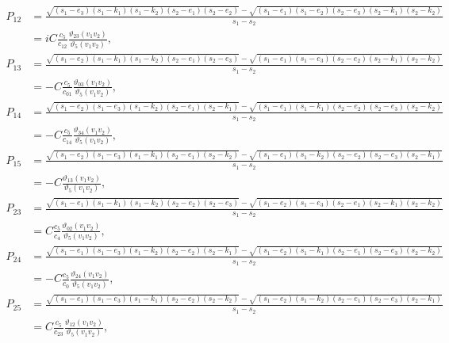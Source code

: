 \documentclass{article}
\begin{document}
\begin{align*}
P_{12} &= \frac{\sqrt{(s_1 - e_3)(s_1 - k_1)(s_1 - k_2)(s_2 - e_1)(s_2 - e_2)} - \sqrt{(s_1 - e_1)(s_1 - e_2)(s_2 - e_3)(s_2 - k_1)(s_2 - k_2)}}{s_1 - s_2} \\
&= iC\frac{c_5}{c_{12}}\frac{\vartheta_{23}(v_1v_2)}{\vartheta_5(v_1v_2)},
\end{align*}
\begin{align*}
P_{13} &= \frac{\sqrt{(s_1 - e_2)(s_1 - k_1)(s_1 - k_2)(s_2 - e_1)(s_2 - e_3)} - \sqrt{(s_1 - e_1)(s_1 - e_3)(s_2 - e_2)(s_2 - k_1)(s_2 - k_2)}}{s_1 - s_2} \\
&= -C\frac{c_5}{c_{01}}\frac{\vartheta_{03}(v_1v_2)}{\vartheta_5(v_1v_2)},
\end{align*}
\begin{align*}
P_{14} &= \frac{\sqrt{(s_1 - e_2)(s_1 - e_3)(s_1 - k_2)(s_2 - e_1)(s_2 - k_1)} - \sqrt{(s_1 - e_1)(s_1 - k_1)(s_2 - e_2)(s_2 - e_3)(s_2 - k_2)}}{s_1 - s_2} \\
&= -C\frac{c_5}{c_{14}}\frac{\vartheta_{34}(v_1v_2)}{\vartheta_5(v_1v_2)},
\end{align*}
\begin{align*}
P_{15} &= \frac{\sqrt{(s_1 - e_2)(s_1 - e_3)(s_1 - k_1)(s_2 - e_1)(s_2 - k_2)} - \sqrt{(s_1 - e_1)(s_1 - k_2)(s_2 - e_2)(s_2 - e_3)(s_2 - k_1)}}{s_1 - s_2} \\
&= -C\frac{\vartheta_{13}(v_1v_2)}{\vartheta_5(v_1v_2)},
\end{align*}
\begin{align*}
P_{23} &= \frac{\sqrt{(s_1 - e_1)(s_1 - k_1)(s_1 - k_2)(s_2 - e_2)(s_2 - e_3)} - \sqrt{(s_1 - e_2)(s_1 - e_3)(s_2 - e_1)(s_2 - k_1)(s_2 - k_2)}}{s_1 - s_2} \\
&= C\frac{c_5}{c_4}\frac{\vartheta_{02}(v_1v_2)}{\vartheta_5(v_1v_2)},
\end{align*}
\begin{align*}
P_{24} &= \frac{\sqrt{(s_1 - e_1)(s_1 - e_3)(s_1 - k_2)(s_2 - e_2)(s_2 - k_1)} - \sqrt{(s_1 - e_2)(s_1 - k_1)(s_2 - e_1)(s_2 - e_3)(s_2 - k_2)}}{s_1 - s_2} \\
&= -C\frac{c_5}{c_0}\frac{\vartheta_{24}(v_1v_2)}{\vartheta_5(v_1v_2)},
\end{align*}
\begin{align*}
P_{25} &= \frac{\sqrt{(s_1 - e_1)(s_1 - e_3)(s_1 - k_1)(s_2 - e_2)(s_2 - k_2)} - \sqrt{(s_1 - e_2)(s_1 - k_2)(s_2 - e_1)(s_2 - e_3)(s_2 - k_1)}}{s_1 - s_2} \\
&= C\frac{c_5}{c_{23}}\frac{\vartheta_{12}(v_1v_2)}{\vartheta_5(v_1v_2)},
\end{align*}
\end{document}
